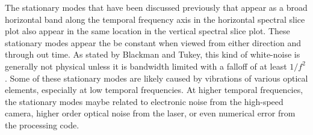 The stationary modes that have been discussed previously that appear as a broad horizontal band along the temporal frequency axis in the horizontal spectral slice plot also appear in the same location in the vertical spectral slice plot.
These stationary modes appear the be constant when viewed from either direction and through out time.
As stated by Blackman and Tukey, this kind of white-noise is generally not physical unless it is bandwidth limited with a falloff of at least $1/f^2$ \cite{Blackman-1958-4QtKgDb8}.
Some of these stationary modes are likely caused by vibrations of various optical elements, especially at low temporal frequencies.
At higher temporal frequencies, the stationary modes maybe related to electronic noise from the high-speed camera, higher order optical noise from the laser, or even numerical error from the processing code.

